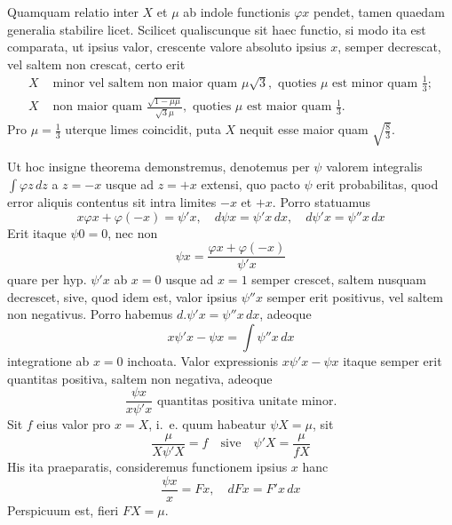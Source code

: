 \documentclass[12pt,a4paper]{book}
\begin{document}
Quamquam relatio inter $X$ et $\mu$ ab indole functionis $\varphi x$ pendet, tamen quaedam generalia stabilire licet. Scilicet qualiscunque sit haec functio, si modo ita est comparata, ut ipsius valor, crescente valore absoluto ipsius $x$, semper decrescat, vel saltem non crescat, certo erit
%
\begin{align*}
X &\text{ minor vel saltem non maior quam }\mu\sqrt{3},\text{ quoties }\mu\text{ est minor quam }\tfrac{1}{3};\\
X &\text{ non maior quam }\tfrac{\sqrt{1-\mu\mu}}{\sqrt{3}\mu},\text{ quoties }\mu\text{ est maior quam }\tfrac{1}{3}.
\end{align*}
Pro $\mu=\tfrac{1}{3}$ uterque limes coincidit, puta $X$ nequit esse maior quam $\sqrt{\tfrac{8}{3}}$.

Ut hoc insigne theorema demonstremus, denotemus per $\psi$ valorem integralis $\int\varphi z\,dz$ a $z=-x$ usque ad $z=+x$ extensi, quo pacto $\psi$ erit probabilitas, quod error aliquis contentus sit intra limites $-x$ et $+x$. Porro statuamus
%
\begin{equation*}
x\varphi x+\varphi(-x)=\psi'x,\quad d\psi x=\psi'x\,dx,\quad d\psi'x=\psi''x\,dx
\end{equation*}
Erit itaque $\psi 0=0$, nec non
%
\begin{equation*}
\psi x = \frac{\varphi x+\varphi(-x)}{\psi'x}
\end{equation*}
quare per hyp. $\psi'x$ ab $x=0$ usque ad $x=1$ semper crescet, saltem nusquam decrescet, sive, quod idem est, valor ipsius $\psi''x$ semper erit positivus, vel saltem non negativus. Porro habemus $d.\psi'x=\psi''x\,dx$, adeoque
%
\begin{equation*}
x\psi'x-\psi x = \int\psi''x\,dx
\end{equation*}
integratione ab $x=0$ inchoata. Valor expressionis $x\psi'x-\psi x$ itaque semper erit quantitas positiva, saltem non negativa, adeoque
%
\begin{equation*}
\frac{\psi x}{x\psi'x}\text{ quantitas positiva unitate minor.}
\end{equation*}
Sit $f$ eius valor pro $x=X$, i.~e. quum habeatur $\psi X=\mu$, sit
%
\begin{equation*}
\frac{\mu}{X\psi'X}=f\quad\text{sive}\quad\psi'X=\frac{\mu}{fX}
\end{equation*}
His ita praeparatis, consideremus functionem ipsius $x$ hanc
%
\begin{equation*}
\frac{\psi x}{x}=Fx,\quad dFx=F'x\,dx
\end{equation*}
Perspicuum est, fieri $FX=\mu$.
\end{document}
